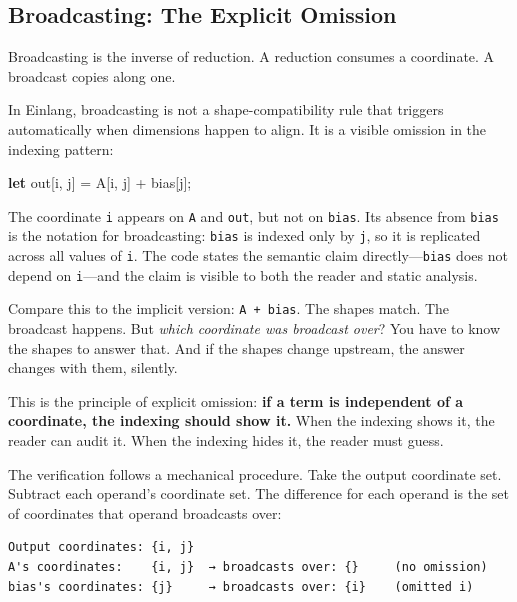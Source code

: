 \documentclass[11pt,titlepage]{article}
\newenvironment{Shaded}{}{}
\newcommand{\KeywordTok}[1]{\textcolor[rgb]{0.00,0.44,0.13}{\textbf{#1}}}
\newcommand{\NormalTok}[1]{#1}
\newcommand{\OperatorTok}[1]{\textcolor[rgb]{0.40,0.40,0.40}{#1}}
\begin{document}
\hypertarget{broadcasting-the-explicit-omission}{%
\subsection{Broadcasting: The Explicit
Omission}\label{broadcasting-the-explicit-omission}}

Broadcasting is the inverse of reduction. A reduction consumes a
coordinate. A broadcast copies along one.

In Einlang, broadcasting is not a shape-compatibility rule that triggers
automatically when dimensions happen to align. It is a visible omission
in the indexing pattern:

\begin{Shaded}
\begin{Highlighting}[]
\KeywordTok{let}\NormalTok{ out}\OperatorTok{[}\NormalTok{i, j}\OperatorTok{]}\NormalTok{ = A}\OperatorTok{[}\NormalTok{i, j}\OperatorTok{]}\NormalTok{ + bias}\OperatorTok{[}\NormalTok{j}\OperatorTok{]}\NormalTok{;}
\end{Highlighting}
\end{Shaded}

The coordinate \texttt{i} appears on \texttt{A} and \texttt{out}, but
not on \texttt{bias}. Its absence from \texttt{bias} is the notation for
broadcasting: \texttt{bias} is indexed only by \texttt{j}, so it is
replicated across all values of \texttt{i}. The code states the semantic
claim directly---\texttt{bias} does not depend on \texttt{i}---and the
claim is visible to both the reader and static analysis.

Compare this to the implicit version: \texttt{A\ +\ bias}. The shapes
match. The broadcast happens. But \emph{which coordinate was broadcast
over}? You have to know the shapes to answer that. And if the shapes
change upstream, the answer changes with them, silently.

This is the principle of explicit omission: \textbf{if a term is
independent of a coordinate, the indexing should show it.} When the
indexing shows it, the reader can audit it. When the indexing hides it,
the reader must guess.

The verification follows a mechanical procedure. Take the output
coordinate set. Subtract each operand's coordinate set. The difference
for each operand is the set of coordinates that operand broadcasts over:

\begin{verbatim}
Output coordinates: {i, j}
A's coordinates:    {i, j}  → broadcasts over: {}     (no omission)
bias's coordinates: {j}     → broadcasts over: {i}    (omitted i)
\end{verbatim}
\end{document}
